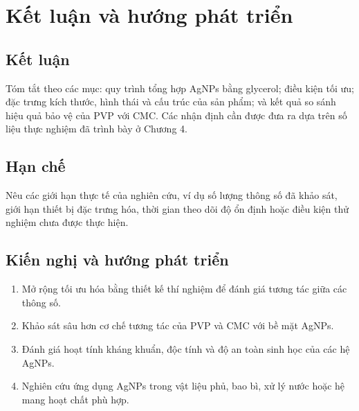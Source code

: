 \chapter{Kết luận và hướng phát triển}

\section{Kết luận}
Tóm tắt theo các mục: quy trình tổng hợp AgNPs bằng glycerol; điều kiện tối ưu; đặc trưng kích thước, hình thái và cấu trúc của sản phẩm; và kết quả so sánh hiệu quả bảo vệ của PVP với CMC. Các nhận định cần được đưa ra dựa trên số liệu thực nghiệm đã trình bày ở Chương 4.

\section{Hạn chế}
Nêu các giới hạn thực tế của nghiên cứu, ví dụ số lượng thông số đã khảo sát, giới hạn thiết bị đặc trưng hóa, thời gian theo dõi độ ổn định hoặc điều kiện thử nghiệm chưa được thực hiện.

\section{Kiến nghị và hướng phát triển}
\begin{enumerate}
  \item Mở rộng tối ưu hóa bằng thiết kế thí nghiệm để đánh giá tương tác giữa các thông số.
  \item Khảo sát sâu hơn cơ chế tương tác của PVP và CMC với bề mặt AgNPs.
  \item Đánh giá hoạt tính kháng khuẩn, độc tính và độ an toàn sinh học của các hệ AgNPs.
  \item Nghiên cứu ứng dụng AgNPs trong vật liệu phủ, bao bì, xử lý nước hoặc hệ mang hoạt chất phù hợp.
\end{enumerate}
